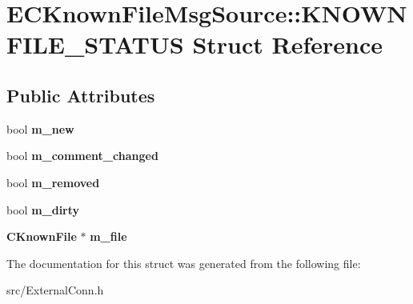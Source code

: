 \section{ECKnownFileMsgSource::KNOWNFILE\_\-STATUS Struct Reference}
\label{structECKnownFileMsgSource_1_1KNOWNFILE__STATUS}
\subsection*{Public Attributes}
\begin{DoxyCompactItemize}
\item 
bool {\bfseries m\_\-new}\label{structECKnownFileMsgSource_1_1KNOWNFILE__STATUS_a0ca908bfd05c2db171560dfc949c568e}

\item 
bool {\bfseries m\_\-comment\_\-changed}\label{structECKnownFileMsgSource_1_1KNOWNFILE__STATUS_ae8fd4f1b257e5fa68074be0c3d82920d}

\item 
bool {\bfseries m\_\-removed}\label{structECKnownFileMsgSource_1_1KNOWNFILE__STATUS_ab4776d96d896407e59dd7e1078f509b1}

\item 
bool {\bfseries m\_\-dirty}\label{structECKnownFileMsgSource_1_1KNOWNFILE__STATUS_a770faa77e6c2d124e194ef2d2532970c}

\item 
{\bf CKnownFile} $\ast$ {\bfseries m\_\-file}\label{structECKnownFileMsgSource_1_1KNOWNFILE__STATUS_a0465587079a62f72051b55cb79d50673}

\end{DoxyCompactItemize}


The documentation for this struct was generated from the following file:\begin{DoxyCompactItemize}
\item 
src/ExternalConn.h\end{DoxyCompactItemize}
